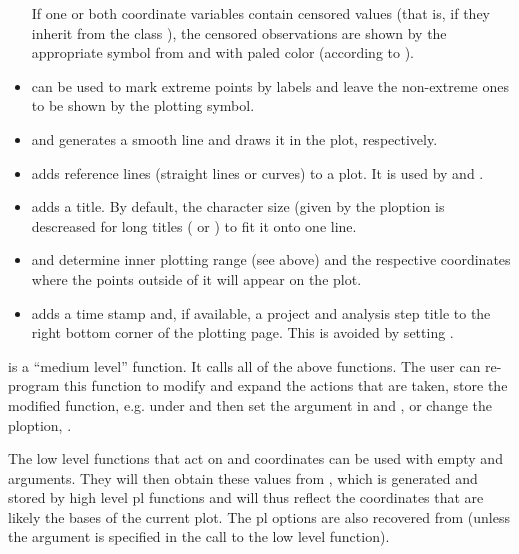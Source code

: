 \documentclass[11pt]{article}
\begin{document}
\begin{itemize}
  If one or both coordinate variables contain censored values (that is,
  if they inherit from the class ), the censored observations are
  shown by the appropriate symbol from \Hneed{80mm}
   and 
  with paled color (according to ).
\item
   can be used to mark extreme points by labels and leave the
  non-extreme ones to be shown by the plotting symbol.
\item
   and  generates a smooth line and draws it 
  in the plot, respectively.
\item
   adds reference lines (straight lines or curves) to a plot.
  It is used by  and .
\item
   adds a title. By default, the character size 
  (given by the ploption  is descreased
  for long titles ( or ) to fit it onto one line.
\item
   and  determine inner plotting range 
  (see above) and the respective coordinates where the points outside of it
  will appear on the plot.
\item
   adds a time stamp and, if available, a project and analysis
  step title to the right bottom corner of the plotting page.
  This is avoided by setting .
\end{itemize}

 is a ``medium level'' function. It calls all of the above
functions.
The user can re-program this function to modify and expand the actions that
are taken, store the modified function, e.g. under 
and then set %
the argument  in  and ,
or change the ploption, .

The low level functions that act on  and  coordinates can be used
with empty  and  arguments. They will then obtain these values
from , which is generated and stored by high level 
pl functions and will thus reflect the coordinates that are likely the
bases of the current plot. 
The pl options are also recovered from  (unless the argument
 is specified in the call to the low level function).
\end{document}
